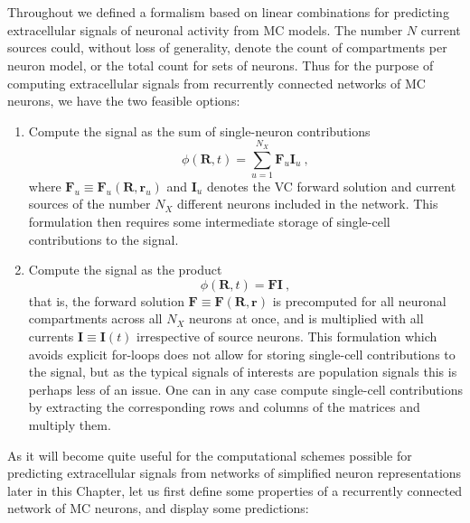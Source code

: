 \section{}
\label{sec:Schemes:networkLFPy}


Throughout  we defined a formalism based on linear combinations for predicting extracellular signals of neuronal activity from MC models. 
The number $N$ current sources could, without loss of generality, denote the count of compartments per neuron model, 
or the total count for sets of neurons. 
Thus for the purpose of computing extracellular signals from recurrently connected networks of MC neurons, 
we have the two feasible options:
\begin{enumerate}
\item Compute the signal as the sum of single-neuron contributions
	\begin{equation}
	\phi(\mathbf{R}, t) = \sum_{u =1}^{N_X} \mathbf{F}_u\mathbf{I}_u~,
	\end{equation}
	where $ \mathbf{F}_u \equiv \mathbf{F}_u(\mathbf{R},\mathbf{r}_u)$  and $ \mathbf{I}_u$ denotes the VC forward solution and current sources of the number $N_X$ different neurons included in the network. 
	This formulation then requires some intermediate storage of single-cell contributions to the signal.
\item Compute the signal as the product
	\begin{equation}
	\phi(\mathbf{R}, t) = \mathbf{F}\mathbf{I}~, 
	\end{equation}
	that is, the forward solution $\mathbf{F} \equiv \mathbf{F}(\mathbf{R},\mathbf{r})$ is precomputed for all neuronal compartments across all $N_X$ neurons at once, and is multiplied with all currents $\mathbf{I} \equiv \mathbf{I}(t)$ irrespective of source neurons. 
	This formulation which avoids explicit for-loops does not allow for storing single-cell contributions to the signal, 
	but as the typical signals of interests are population signals this is perhaps less of an issue. 
	One can in any case compute single-cell contributions by extracting the corresponding rows and columns of the matrices and multiply them.
\end{enumerate}


As it will become quite useful for the computational schemes possible for predicting extracellular signals from networks of simplified neuron representations later in this Chapter, let us first define some properties of a recurrently connected network of MC neurons, 
and display some predictions:



